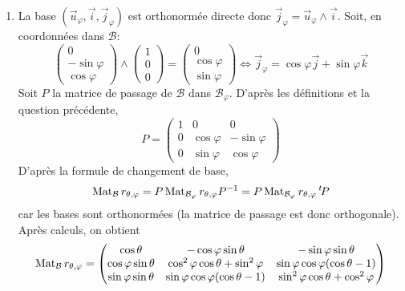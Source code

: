 \begin{enumerate}
\begin{enumerate}
 \item La base $(\overrightarrow{u}_\varphi, \overrightarrow{i},\overrightarrow{j}_\varphi)$ est orthonormée directe donc $\overrightarrow{j}_\varphi=\overrightarrow{u}_\varphi \wedge \overrightarrow{i}$. Soit, en coordonnées dans $\mathcal{B}$:
\begin{displaymath}
 \begin{pmatrix}
  0 \\ -\sin \varphi \\ \cos\varphi
 \end{pmatrix}
\wedge
\begin{pmatrix}
 1 \\ 0 \\ 0
\end{pmatrix}
= \begin{pmatrix}
0 \\ \cos \varphi \\ \sin\varphi   
\end{pmatrix}
\Leftrightarrow
\overrightarrow{j}_\varphi= \cos \varphi \overrightarrow j + \sin\varphi \overrightarrow k
\end{displaymath}
Soit $P$ la matrice de passage de $\mathcal{B}$ dans $\mathcal{B}_\varphi$. D'après les définitions et la question précédente,
\begin{displaymath}
 P = \begin{pmatrix}
 1 & 0 & 0 \\ 0 & \cos \varphi & -\sin \varphi \\ 0 & \sin \varphi & \cos \varphi
\end{pmatrix}
\end{displaymath}
 D'après la formule de changement de base,
\begin{displaymath}
\operatorname{Mat}_{\mathcal{B}}r_{\theta,\varphi}= P \operatorname{Mat}_{\mathcal{B_\varphi}}r_{\theta,\varphi}P^{-1}
= P \operatorname{Mat}_{\mathcal{B_\varphi}}r_{\theta,\varphi}\,\mathstrut^t\!{P} 
\end{displaymath}
car les bases sont orthonormées (la matrice de passage est donc orthogonale).
Après calculs, on obtient
\begin{displaymath}
 \operatorname{Mat}_{\mathcal{B}}r_{\theta,\varphi}=
\begin{pmatrix}
 \cos \theta & -\cos \varphi \sin \theta & -\sin \varphi \sin \theta \\
 \cos \varphi \sin \theta & \cos^2 \varphi \cos \theta + \sin^2 \varphi & \sin \varphi \cos \varphi(\cos \theta -1) \\
 \sin \varphi \sin \theta & \sin \varphi \cos \varphi(\cos\theta -1) & \sin^2 \varphi \cos \theta + \cos^2 \varphi

\end{pmatrix}
\end{displaymath}
\end{enumerate}
\end{enumerate}
